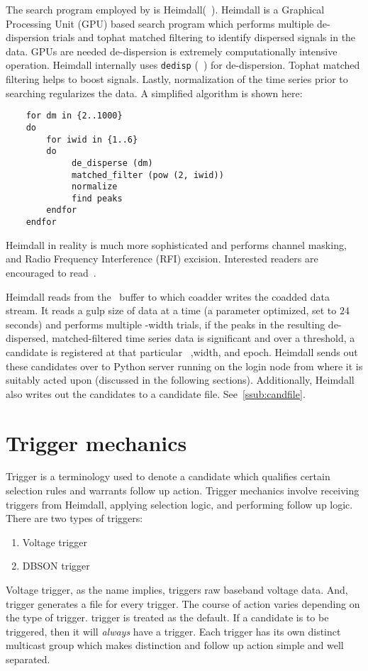 \par The search program employed by \vf is Heimdall(~\cite{heimdall}). 
Heimdall is a Graphical Processing Unit (GPU) based search program which performs multiple de-dispersion trials and tophat matched filtering to identify dispersed signals in the data.
GPUs are needed de-dispersion is extremely computationally intensive operation. 
Heimdall internally uses \texttt{dedisp} (~\cite{dedisp}) for de-dispersion.
Tophat matched filtering helps to boost signals. Lastly, normalization of the time series prior to searching regularizes the data.
A simplified algorithm is shown here:
\begin{verbatim}
	for dm in {2..1000} 
	do
		for iwid in {1..6}
		do
			 de_disperse (dm) 
			 matched_filter (pow (2, iwid))
			 normalize
			 find peaks
		endfor
	endfor
\end{verbatim}

Heimdall in reality is much more sophisticated and performs channel masking, and Radio Frequency Interference (RFI) excision. Interested readers are encouraged to read~\cite{heimdall}.

\par Heimdall reads from the \dada~buffer to which coadder writes the coadded data stream. 
It reads a gulp size of data at a time (a parameter optimized, set to $24$ seconds) and performs multiple
\dm-width trials, if the peaks in the resulting de-dispersed, matched-filtered time series data is significant and over a threshold, 
a candidate is registered at that particular \dm~,width, and epoch.
Heimdall sends out these candidates over to Python server running on the login node from where it is suitably acted upon (discussed in the following sections). 
Additionally, Heimdall also writes out the candidates to a candidate file. See~\autoref{ssub:candfile}.

\section {Trigger mechanics}
\label{sec:tmech}

\par Trigger is a terminology used to denote a candidate which qualifies certain selection rules and warrants follow up action. Trigger mechanics involve receiving triggers from Heimdall, applying selection logic, and performing follow up logic. 
There are two types of triggers: 
\begin{enumerate}
	\item Voltage trigger
	\item DBSON trigger
\end{enumerate}
Voltage trigger, as the name implies, triggers raw baseband voltage data. And, \dbson trigger generates a \dbson file for every trigger. The course of action varies depending on the type of trigger. 
\dbson trigger is treated as the default. If a candidate is to be triggered, then it will \emph{always} have a \dbson trigger.
Each trigger has its own distinct multicast group which makes distinction and follow up action simple and well separated.

